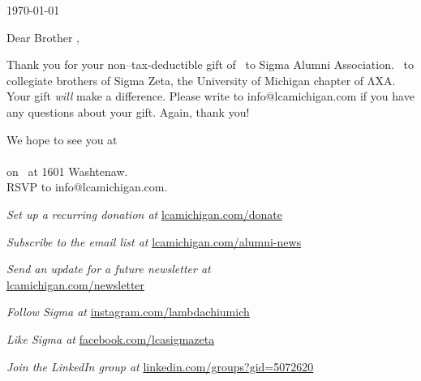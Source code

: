 \documentclass{article}
\newlength\topWindowMinY
\newlength\topWindowWidth
\newlength\topWindowHeight
\newlength\bottomWindowMinY
\newlength\bottomWindowWidth
\newlength\bottomWindowHeight
\begin{document}
\vfill

\today

\vspace{0.25in}

Dear Brother \donorLastName,

Thank you for your non–tax-deductible gift of \donationAmount\ to Sigma Alumni
Association. \donationMessage\ to collegiate brothers of Sigma Zeta, the
University of Michigan chapter of ΛΧΑ. Your gift \emph{will} make a difference.
Please write to info@lcamichigan.com if you have any questions about your gift.
Again, thank you!

\vfill

{\fontsize{14}{22}\selectfont{}
  We hope to see you at\\[8bp]
  {\sffamily\fontsize{24}{24}\selectfont{}
    \MakeUppercase{\eventName}%
  }\\
  on \eventDate\ at 1601 Washtenaw.\\
  RSVP to info@lcamichigan.com.\par
}

\vspace{0.25in}

\emph{Set up a recurring donation at} \url{lcamichigan.com/donate}

\emph{Subscribe to the email list at} \url{lcamichigan.com/alumni-news}

\emph{Send an update for a future newsletter at\\}
\url{lcamichigan.com/newsletter}

\emph{Follow Sigma at} \url{instagram.com/lambdachiumich}

\emph{Like Sigma at} \url{facebook.com/lcasigmazeta}

\emph{Join the LinkedIn group at} \url{linkedin.com/groups?gid=5072620}

\iffalse
\newlength\windowMinX
\windowMinX=0.375in
\begin{tikzpicture}[remember picture,overlay]
  \begin{scope}[lightgray]
    \draw
      ([shift={(\windowMinX, -\topWindowMinY)}]current page.north west) rectangle
      ([shift={(\windowMinX + \topWindowWidth, -(\topWindowMinY + \topWindowHeight))}]current page.north west);
    \draw
      ([shift={(\windowMinX, -\bottomWindowMinY)}]current page.north west) rectangle
      ([shift={(\windowMinX + \bottomWindowWidth, -(\bottomWindowMinY + \bottomWindowHeight))}]current page.north west);
  \end{scope}
\end{tikzpicture}
\fi
\end{document}
